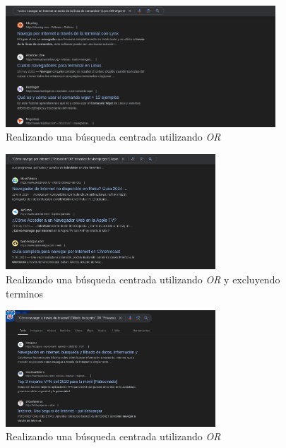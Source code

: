 \documentclass[12pt]{article}
\begin{document}
                \begin{figure}[h!]
                        \centering
                        \includegraphics[width=0.9\textwidth]{img/t1-4.png}
                        \caption{Realizando una búsqueda centrada utilizando \textit{OR}}
                \end{figure}

                \begin{figure}[h!]
                        \centering
                        \includegraphics[width=0.7\textwidth]{img/t1-5.png}
                        \caption{Realizando una búsqueda centrada utilizando \textit{OR} y excluyendo terminos}
                \end{figure}

                \begin{figure}[h!]
                        \centering
                        \includegraphics[width=0.7\textwidth]{img/t1-6.png}
                        \caption{Realizando una búsqueda centrada utilizando \textit{OR}}
                \end{figure}
\end{document}
